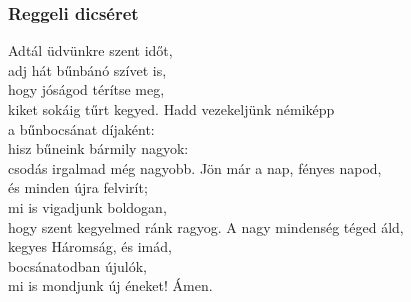 \documentclass[twoside]{article}
\begin{document}


\subsubsection*{Reggeli dicséret}



\begin{hymnstanzas}
  Adtál üdvünkre szent időt, \\
  adj hát bűnbánó szívet is, \\
  hogy jóságod térítse meg, \\
  kiket sokáig tűrt kegyed.
\stanzabreak
  Hadd vezekeljünk némiképp \\
  a bűnbocsánat díjaként: \\
  hisz bűneink bármily nagyok: \\
  csodás irgalmad még nagyobb.
\stanzabreak
  Jön már a nap, fényes napod, \\
  és minden újra felvirít; \\
  mi is vigadjunk boldogan, \\
  hogy szent kegyelmed ránk ragyog.
\stanzabreak
  A nagy mindenség téged áld, \\
  kegyes Háromság, és imád, \\
  bocsánatodban újulók, \\
  mi is mondjunk új éneket! Ámen.
\end{hymnstanzas}



\end{document}
